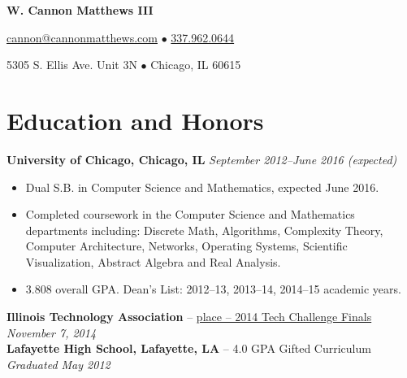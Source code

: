 \documentclass[10pt,letterpaper]{article} %
\begin{document}
 
    \centerline{\LARGE \bf W. Cannon Matthews III} 
    \centerline{ \href{mailto:cannon@cannonmatthews.com}{cannon@cannonmatthews.com} $\bullet$ \href{tel:13379620644}{337.962.0644 }}
    \centerline{5305 S. Ellis Ave. Unit 3N $\bullet$ Chicago, IL 60615 }
    \hrulefill
%
    \section*{Education and Honors}
        \textbf{University of Chicago, Chicago, IL} \hfill \textit{ September 2012--June 2016 (expected) } 
        \begin{itemize} 
            \item Dual S.B. in Computer Science and Mathematics, expected June 2016. 
            \item Completed coursework in the Computer Science and Mathematics departments including: Discrete Math, Algorithms, Complexity Theory, Computer Architecture, Networks, Operating Systems, Scientific Visualization, Abstract Algebra and Real Analysis.  
            \item 3.808 overall GPA. Dean's List: 2012--13, 2013--14, 2014--15 academic years. 
        \end{itemize}
        \textbf{Illinois Technology Association} -- \href{http://www.chicagotribune.com/bluesky/originals/chi-university-of-chicago-student-wins-tech-challenge-bsi-story.html}{ place -- 2014 Tech Challenge Finals} \hfill \textit{November 7, 2014} 
        \vspace{0.5em}\\
        \textbf{Lafayette High School, Lafayette, LA} -- 4.0 GPA Gifted Curriculum \hfill \textit{Graduated May 2012 } 
\end{document}
